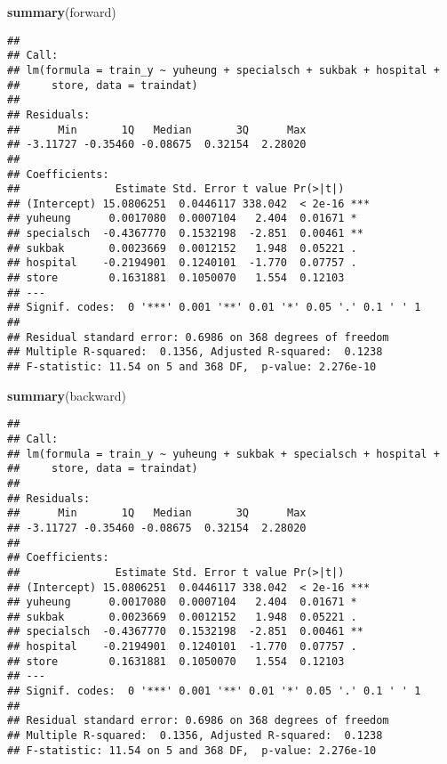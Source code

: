 \documentclass[]{article}
\newenvironment{Shaded}{\begin{snugshade}}{\end{snugshade}}
\newcommand{\KeywordTok}[1]{\textcolor[rgb]{0.13,0.29,0.53}{\textbf{#1}}}
\newcommand{\NormalTok}[1]{#1}
\begin{document}
\begin{Shaded}
\begin{Highlighting}[]
\KeywordTok{summary}\NormalTok{(forward)}
\end{Highlighting}
\end{Shaded}

\begin{verbatim}
## 
## Call:
## lm(formula = train_y ~ yuheung + specialsch + sukbak + hospital + 
##     store, data = traindat)
## 
## Residuals:
##      Min       1Q   Median       3Q      Max 
## -3.11727 -0.35460 -0.08675  0.32154  2.28020 
## 
## Coefficients:
##               Estimate Std. Error t value Pr(>|t|)    
## (Intercept) 15.0806251  0.0446117 338.042  < 2e-16 ***
## yuheung      0.0017080  0.0007104   2.404  0.01671 *  
## specialsch  -0.4367770  0.1532198  -2.851  0.00461 ** 
## sukbak       0.0023669  0.0012152   1.948  0.05221 .  
## hospital    -0.2194901  0.1240101  -1.770  0.07757 .  
## store        0.1631881  0.1050070   1.554  0.12103    
## ---
## Signif. codes:  0 '***' 0.001 '**' 0.01 '*' 0.05 '.' 0.1 ' ' 1
## 
## Residual standard error: 0.6986 on 368 degrees of freedom
## Multiple R-squared:  0.1356, Adjusted R-squared:  0.1238 
## F-statistic: 11.54 on 5 and 368 DF,  p-value: 2.276e-10
\end{verbatim}

\begin{Shaded}
\begin{Highlighting}[]
\KeywordTok{summary}\NormalTok{(backward)}
\end{Highlighting}
\end{Shaded}

\begin{verbatim}
## 
## Call:
## lm(formula = train_y ~ yuheung + sukbak + specialsch + hospital + 
##     store, data = traindat)
## 
## Residuals:
##      Min       1Q   Median       3Q      Max 
## -3.11727 -0.35460 -0.08675  0.32154  2.28020 
## 
## Coefficients:
##               Estimate Std. Error t value Pr(>|t|)    
## (Intercept) 15.0806251  0.0446117 338.042  < 2e-16 ***
## yuheung      0.0017080  0.0007104   2.404  0.01671 *  
## sukbak       0.0023669  0.0012152   1.948  0.05221 .  
## specialsch  -0.4367770  0.1532198  -2.851  0.00461 ** 
## hospital    -0.2194901  0.1240101  -1.770  0.07757 .  
## store        0.1631881  0.1050070   1.554  0.12103    
## ---
## Signif. codes:  0 '***' 0.001 '**' 0.01 '*' 0.05 '.' 0.1 ' ' 1
## 
## Residual standard error: 0.6986 on 368 degrees of freedom
## Multiple R-squared:  0.1356, Adjusted R-squared:  0.1238 
## F-statistic: 11.54 on 5 and 368 DF,  p-value: 2.276e-10
\end{verbatim}
\end{document}
